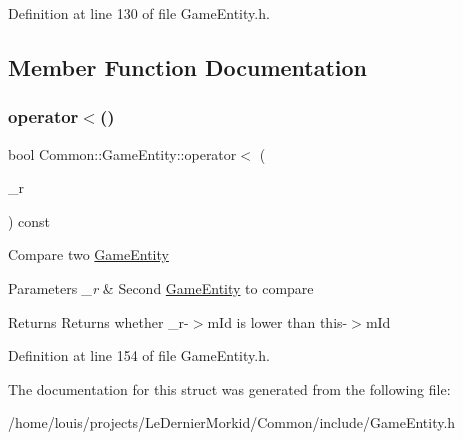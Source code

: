 Definition at line 130 of file Game\+Entity.\+h.



\subsection{Member Function Documentation}
\mbox{\label{struct_common_1_1_game_entity_a9d46d0e1dfa65029ee7acda84b5d648f}} 
\subsubsection{\texorpdfstring{operator$<$()}{operator<()}}
{\footnotesize\ttfamily bool Common\+::\+Game\+Entity\+::operator$<$ (\begin{DoxyParamCaption}\item[{const \hyperlink{struct_common_1_1_game_entity}{Game\+Entity} $\ast$}]{\+\_\+r }\end{DoxyParamCaption}) const\hspace{0.3cm}{\ttfamily [inline]}}

Compare two \hyperlink{struct_common_1_1_game_entity}{Game\+Entity} 
\begin{DoxyParams}{Parameters}
{\em \+\_\+r} & Second \hyperlink{struct_common_1_1_game_entity}{Game\+Entity} to compare \\
\hline
\end{DoxyParams}
\begin{DoxyReturn}{Returns}
Returns whether \+\_\+r-\/$>$m\+Id is lower than this-\/$>$m\+Id 
\end{DoxyReturn}


Definition at line 154 of file Game\+Entity.\+h.



The documentation for this struct was generated from the following file\+:\begin{DoxyCompactItemize}
\item 
/home/louis/projects/\+Le\+Dernier\+Morkid/\+Common/include/Game\+Entity.\+h\end{DoxyCompactItemize}
